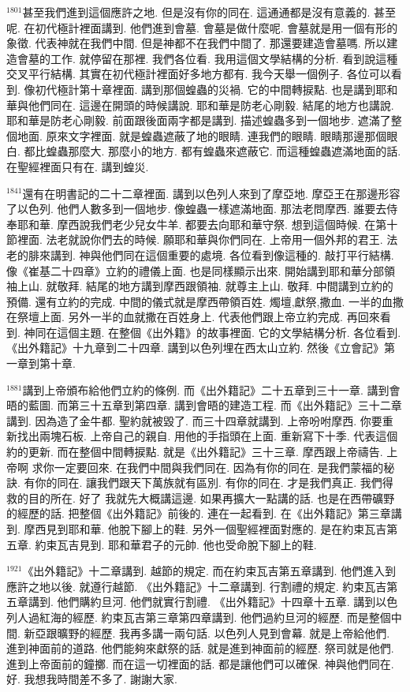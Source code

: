 \documentclass{book}
\begin{document}
$^{1801}$甚至我們進到這個應許之地.
但是沒有你的同在.
這通通都是沒有意義的.
甚至呢.
在初代極計裡面講到.
他們進到會墓.
會墓是做什麼呢.
會墓就是用一個有形的象徵.
代表神就在我們中間.
但是神都不在我們中間了.
那還要建造會墓嗎.
所以建造會墓的工作.
就停留在那裡.
我們各位看.
我用這個文學結構的分析.
看到說這種交叉平行結構.
其實在初代極計裡面好多地方都有.
我今天舉一個例子.
各位可以看到.
像初代極計第十章裡面.
講到那個蝗蟲的災禍.
它的中間轉捩點.
也是講到耶和華與他們同在.
這邊在開頭的時候講說.
耶和華是防老心剛毅.
結尾的地方也講說.
耶和華是防老心剛毅.
前面跟後面兩字都是講到.
描述蝗蟲多到一個地步.
遮滿了整個地面.
原來文字裡面.
就是蝗蟲遮蔽了地的眼睛.
連我們的眼睛.
眼睛那邊那個眼白.
都比蝗蟲那麼大.
那麼小的地方.
都有蝗蟲來遮蔽它.
而這種蝗蟲遮滿地面的話.
在聖經裡面只有在.
講到蝗災.

$^{1841}$還有在明書記的二十二章裡面.
講到以色列人來到了摩亞地.
摩亞王在那邊形容了以色列.
他們人數多到一個地步.
像蝗蟲一樣遮滿地面.
那法老問摩西.
誰要去侍奉耶和華.
摩西說我們老少兒女牛羊.
都要去向耶和華守祭.
想到這個時候.
在第十節裡面.
法老就說你們去的時候.
願耶和華與你們同在.
上帝用一個外邦的君王.
法老的腓來講到.
神與他們同在這個重要的處境.
各位看到像這種的.
敲打平行結構.
像《崔基二十四章》立約的禮儀上面.
也是同樣顯示出來.
開始講到耶和華分部領袖上山.
就敬拜.
結尾的地方講到摩西跟領袖.
就尊主上山.
敬拜.
中間講到立約的預備.
還有立約的完成.
中間的儀式就是摩西帶領百姓.
燭壇,獻祭,撒血.
一半的血撒在祭壇上面.
另外一半的血就撒在百姓身上.
代表他們跟上帝立約完成.
再回來看到.
神同在這個主題.
在整個《出外籍》的故事裡面.
它的文學結構分析.
各位看到.
《出外籍記》十九章到二十四章.
講到以色列埋在西太山立約.
然後《立會記》第一章到第十章.

$^{1881}$講到上帝頒布給他們立約的條例.
而《出外籍記》二十五章到三十一章.
講到會晤的藍圖.
而第三十五章到第四章.
講到會晤的建造工程.
而《出外籍記》三十二章講到.
因為造了金牛都.
聖約就被毀了.
而三十四章就講到.
上帝吩咐摩西.
你要重新找出兩塊石板.
上帝自己的親自.
用他的手指頭在上面.
重新寫下十季.
代表這個約的更新.
而在整個中間轉捩點.
就是《出外籍記》三十三章.
摩西跟上帝禱告.
上帝啊 求你一定要回來.
在我們中間與我們同在.
因為有你的同在.
是我們蒙福的秘訣.
有你的同在.
讓我們跟天下萬族就有區別.
有你的同在.
才是我們真正.
我們得救的目的所在.
好了 我就先大概講這邊.
如果再擴大一點講的話.
也是在西帶礦野的經歷的話.
把整個《出外籍記》前後的.
連在一起看到.
在《出外籍記》第三章講到.
摩西見到耶和華.
他脫下腳上的鞋.
另外一個聖經裡面對應的.
是在約束瓦吉第五章.
約束瓦吉見到.
耶和華君子的元帥.
他也受命脫下腳上的鞋.

$^{1921}$《出外籍記》十二章講到.
越節的規定.
而在約束瓦吉第五章講到.
他們進入到應許之地以後.
就遵行越節.
《出外籍記》十二章講到.
行割禮的規定.
約束瓦吉第五章講到.
他們購約旦河.
他們就實行割禮.
《出外籍記》十四章十五章.
講到以色列人過紅海的經歷.
約束瓦吉第三章第四章講到.
他們過約旦河的經歷.
而是整個中間.
新亞跟曠野的經歷.
我再多講一兩句話.
以色列人見到會幕.
就是上帝給他們.
進到神面前的道路.
他們能夠來獻祭的話.
就是進到神面前的經歷.
祭司就是他們.
進到上帝面前的鐘擲.
而在這一切裡面的話.
都是讓他們可以確保.
神與他們同在.
好.
我想我時間差不多了.
謝謝大家.
\newpage
\end{document}
